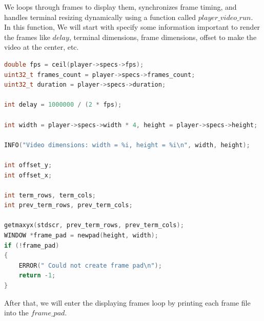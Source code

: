 \documentclass[a4paper,12pt]{article}
\begin{document}
\newpage
We loops through frames to display them, synchronizes frame timing, and handles terminal resizing dynamically using a function called $player\_video\_run$.\\

In this function, We will start with specify some information important to render the frames like $delay$, terminal dimensions, frame dimensions, offset to make the video at the center, etc.

\begin{lstlisting}[language=c]
double fps = ceil(player->specs->fps);
uint32_t frames_count = player->specs->frames_count;
uint32_t duration = player->specs->duration;

int delay = 1000000 / (2 * fps);

int width = player->specs->width * 4, height = player->specs->height;

INFO("Video dimensions: width = %i, height = %i\n", width, height);

int offset_y;
int offset_x;

int term_rows, term_cols;
int prev_term_rows, prev_term_cols;

getmaxyx(stdscr, prev_term_rows, prev_term_cols);
WINDOW *frame_pad = newpad(height, width);
if (!frame_pad)
{
    ERROR(" Could not create frame pad\n");
    return -1;
}
\end{lstlisting}

After that, we will enter the displaying frames loop by printing each frame file into the $frame\_pad$.
\end{document}
